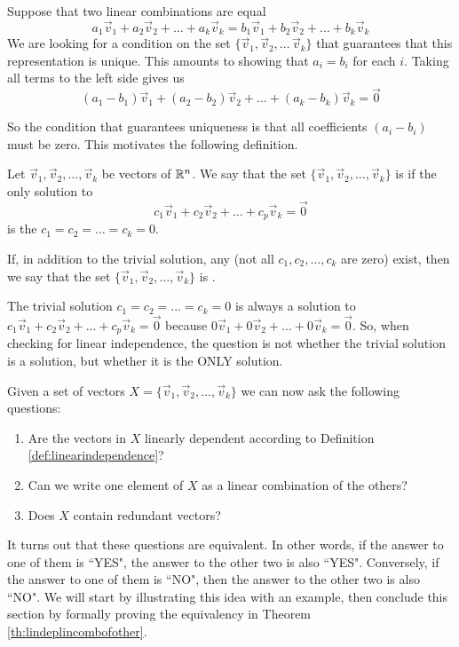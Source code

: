 \documentclass{ximera}
\begin{document}
Suppose that two linear combinations are equal
 $$a_1\vec{v}_1+a_2\vec{v}_2+\dots +a_k\vec{v}_k=b_1\vec{v}_1+b_2\vec{v}_2+\dots +b_k\vec{v}_k$$ 
We are looking for a condition on the set $\{\vec{v}_1, \vec{v}_2,\dots\,\vec{v}_k\}$ that guarantees that this representation is unique.  This amounts to showing that $a_i=b_i$ for each $i$.  Taking all terms to the left side gives us
$$(a_1-b_1)\vec{v}_1+(a_2-b_2)\vec{v}_2+\dots +(a_k-b_k)\vec{v}_k=\vec{0}$$

So the condition that guarantees uniqueness is that all coefficients $(a_i-b_i)$ must be zero.  This motivates the following definition.

\begin{definition}\label{def:linearindependence}
Let $\vec{v}_1, \vec{v}_2,\ldots ,\vec{v}_k$ be vectors of $\mathbb{R}^n$.  We say that the set $\{\vec{v}_1, \vec{v}_2,\ldots ,\vec{v}_k\}$ is  if the only solution to 
\begin{equation}\label{eq:defLinInd}c_1\vec{v}_1+c_2\vec{v}_2+\ldots +c_p\vec{v}_k=\vec{0}\end{equation}
is the  $c_1=c_2=\ldots =c_k=0$.

If, in addition to the trivial solution, any  (not all $c_1, c_2,\ldots ,c_k$ are zero) exist, then we say that the set $\{\vec{v}_1, \vec{v}_2,\ldots ,\vec{v}_k\}$ is .
\end{definition}

\begin{observation}
The trivial solution $c_1=c_2=\ldots =c_k=0$ is always a solution to $c_1\vec{v}_1+c_2\vec{v}_2+\ldots +c_p\vec{v}_k=\vec{0}$ because $0\vec{v}_1+0\vec{v}_2+\ldots +0\vec{v}_k=\vec{0}$. So, when checking for linear independence, the question is not whether the trivial solution is a solution, but whether it is the ONLY solution.
\end{observation}

\begin{remark}\label{remark:LinIndEquiv}
Given a set of vectors $X=\{\vec{v}_1,\vec{v}_2,\dots,\vec{v}_k\}$ we can now ask the following questions:
\begin{enumerate}
\item Are the vectors in $X$ linearly dependent according to Definition \ref{def:linearindependence}?
\item Can we write one element of $X$ as a linear combination of the others?
    \item Does $X$ contain redundant vectors?
\end{enumerate}
It turns out that these questions are equivalent.  In other words, if the answer to one of them is ``YES", the answer to the other two is also ``YES".  Conversely, if the answer to one of them is ``NO", then the answer to the other two is also ``NO".  We will start by illustrating this idea with an example, then conclude this section by formally proving the equivalency in Theorem \ref{th:lindeplincombofother}.
\end{remark}
\end{document}
